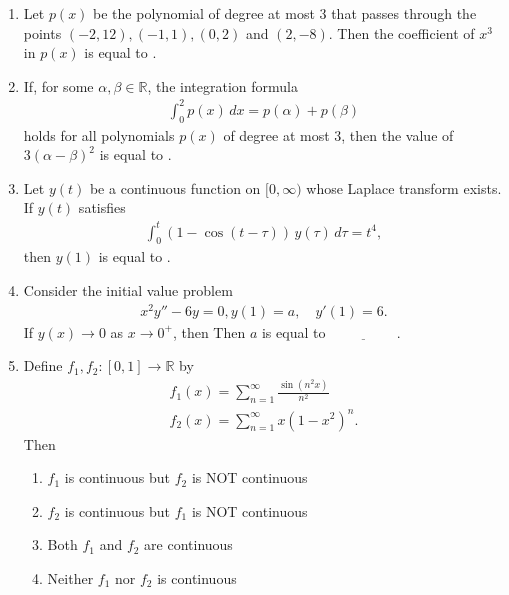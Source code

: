 \documentclass[journal]{IEEEtran}
\numberwithin{equation}{enumi}
\numberwithin{figure}{enumi}
\begin{document}
\begin{enumerate}
\item Let \( p(x) \) be the polynomial of degree at most 3 that passes through the points \( (-2,12), (-1,1), (0,2) \) and \( (2,-8) \).  
Then the coefficient of \( x^3 \) in \( p(x) \) is equal to \underline{\hspace{2cm}}.
\hfill{} 
\vspace{1em}


\item If, for some \( \alpha, \beta \in \mathbb{R} \), the integration formula
\begin{align*}
\int_0^2 p(x)\,dx = p(\alpha) + p(\beta)
\end{align*}
holds for all polynomials \( p(x) \) of degree at most 3, then the value of \( 3(\alpha-\beta)^2 \) is equal to \underline{\hspace{2cm}}.
\hfill{}
\vspace{1em}


\item Let \( y(t) \) be a continuous function on \( [0, \infty) \) whose Laplace transform exists. If \( y(t) \) satisfies
\hfill{}
\begin{align*}
\int_{0}^{t} (1-\cos(t-\tau))\, y(\tau)\, d\tau = t^4,
\end{align*}
then \( y(1) \) is equal to \underline{\hspace{2cm}}.
\vspace{1em}

\item Consider the initial value problem
\hfill{}
\begin{align*}
x^2 y'' - 6y = 0,
y(1) = a, \quad y'(1) = 6.
\end{align*}
If \( y(x) \rightarrow 0 \) as \( x \rightarrow 0^+ \), then
Then \( a \) is equal to \(\underline{\hspace{2cm}}\).
\vspace{1em}

\item Define \( f_1, f_2 : [0,1] \to \mathbb{R} \) by
\begin{align*}
f_1(x) = \sum_{n=1}^{\infty} \frac{\sin(n^2 x)}{n^2}\\
f_2(x) = \sum_{n=1}^{\infty} x (1 - x^2)^n.
\end{align*}
Then
\hfill{}

\begin{enumerate}
  \item \( f_1 \) is continuous but \( f_2 \) is NOT continuous
  \item \( f_2 \) is continuous but \( f_1 \) is NOT continuous
  \item Both \( f_1 \) and \( f_2 \) are continuous
  \item Neither \( f_1 \) nor \( f_2 \) is continuous
\end{enumerate}



\end{enumerate}
\end{document}
